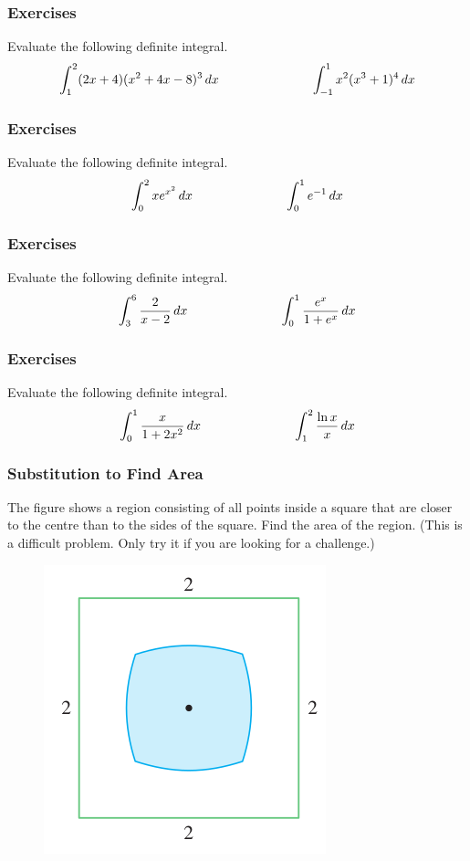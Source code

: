 \documentclass[xcolor=dvipsnames]{beamer}
\begin{document}
\begin{frame}
  \frametitle{Exercises}
{\ubung} Evaluate the following definite integral.
\begin{equation}
  \label{eq:aigighau}
  \int_{1}^{2}(2x+4)(x^{2}+4x-8)^{3}\,dx\hspace{1in}\int_{-1}^{1}x^{2}(x^{3}+1)^{4}\,dx\notag
\end{equation}
\end{frame}

\begin{frame}
  \frametitle{Exercises}
{\ubung} Evaluate the following definite integral.
\begin{equation}
  \label{eq:omixughu}
  \int_{0}^{2}xe^{x^{2}}\,dx\hspace{1in}\int_{0}^{1}e^{-1}\,dx\notag
\end{equation}
\end{frame}

\begin{frame}
  \frametitle{Exercises}
{\ubung} Evaluate the following definite integral.
\begin{equation}
  \label{eq:baemixeg}
  \int_{3}^{6}\frac{2}{x-2}\,dx\hspace{1in}\int_{0}^{1}\frac{e^{x}}{1+e^{x}}\,dx\notag
\end{equation}
\end{frame}

\begin{frame}
  \frametitle{Exercises}
{\ubung} Evaluate the following definite integral.
\begin{equation}
  \label{eq:aeteepah}
  \int_{0}^{1}\frac{x}{1+2x^{2}}\,dx\hspace{1in}\int_{1}^{2}\frac{\ln{}x}{x}\,dx\notag
\end{equation}
\end{frame}

\begin{frame}
  \frametitle{Substitution to Find Area}
  {\ubung} The figure shows a region consisting of all points inside a
  square that are closer to the centre than to the sides of the
  square. Find the area of the region. (This is a difficult problem.
  Only try it if you are looking for a challenge.)
  \begin{figure}[h]
    \includegraphics[scale=0.5]{./diagrams/squarish.png}
  \end{figure}
\end{frame}
\end{document}

